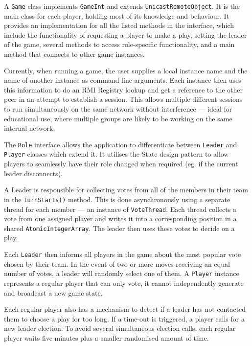 \documentclass[conference]{IEEEtran}
\begin{document}
A \texttt{Game} class implements \texttt{GameInt} and extends
\texttt{UnicastRemoteObject}. It is the main class for each player,
holding most of its knowledge and behaviour. It provides an
implementation for all the listed methods in the interface, which
include the functionality of requesting a player to make a play,
setting the leader of the game, several methods to access
role-specific functionality, and a main method that connects to other game instances.
 
Currently, when running a game, the user supplies a local instance
name and the name of another instance as command line arguments. Each
instance then uses this information to do an RMI Registry lookup and
get a reference to the other peer in an attempt to establish a
session. This allows multiple different sessions to run simultaneously
on the same network without interference --- ideal for educational use, where multiple groups are likely to be working on the same internal network.

The \texttt{Role} interface allows the application to differentiate
between \texttt{Leader} and \texttt{Player} classes which extend
it. It utilises the State design pattern
\cite{DBLP:books/daglib/0078642} to allow players to seamlessly have
their role changed when required (eg. if the current leader
disconnects).

A Leader is responsible for collecting votes from all of the members
in their team in the \texttt{turnStarts()} method. This is done
asynchronously using a separate thread for each member --- an instance
of \texttt{VoteThread}. Each thread collects a vote from one assigned
player and writes it into a corresponding position in a shared
\texttt{AtomicIntegerArray}. The leader then uses these votes to decide
on a play.

Each \texttt{Leader} then informs all players in the game about the
most popular vote chosen by their team. In the event of two or more
moves receiving an equal number of votes, a leader will randomly
select one of them. A \texttt{Player} instance represents a regular
player that can only vote, it cannot independently generate and
broadcast a new game state.

Each regular player also has a mechanism to detect if a leader has not contacted them to choose a play for too long. If a time-out is triggered, a player calls for a new leader election. To avoid several simultaneous election calls, each regular player waits five minutes plus a smaller randomised amount of time.
\end{document}
